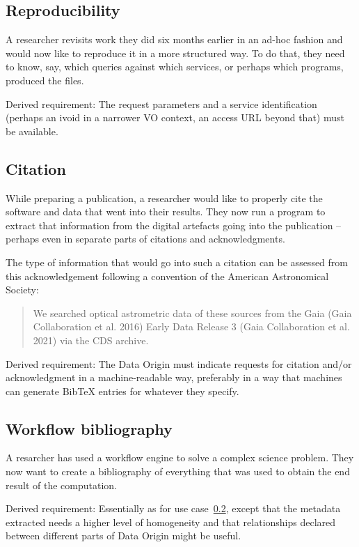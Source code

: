 \documentclass[11pt,a4paper]{ivoa}
\begin{document}
\subsection{Reproducibility}

A researcher revisits work they did six months earlier in an ad-hoc fashion and would now like to reproduce it in a more structured way. To do that, they need to know, say, which queries against which services, or perhaps which programs, produced the files.

Derived requirement: The request parameters and a service identification
(perhaps an ivoid in a narrower VO context, an access URL beyond that) must be available.

\subsection{Citation}
\label{sec:req-citation}

While preparing a publication, a researcher would like to properly cite the software and data that went into their results. They now run a program to extract that information from the digital artefacts going into the publication -- perhaps even in separate parts of citations and acknowledgments.

The type of information that would go into such a
citation can be assessed from this acknowledgement following a
convention of the American Astronomical Society:

\begin{quotation}
We searched optical astrometric data of these sources from the Gaia (Gaia Collaboration et al. 2016) Early Data Release 3 (Gaia Collaboration et al. 2021) via the CDS archive.
\end{quotation}

Derived requirement: The Data Origin must indicate requests for citation
and/or acknowledgment in a machine-readable way, preferably in a way
that machines can generate BibTeX entries for whatever they specify.


\subsection{Workflow bibliography}

A resarcher has used a workflow engine to solve a complex science
problem.  They now want to create a bibliography of everything that was
used to obtain the end result of the computation.

Derived requirement: Essentially as for use case~\ref{sec:req-citation},
except that the metadata extracted needs a higher level of homogeneity
and that relationships declared between different parts of Data Origin
might be useful.
\end{document}
